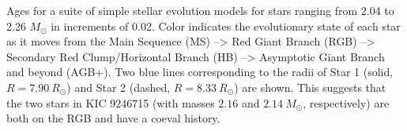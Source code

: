 \label{fig:mesa} Ages for a suite of simple stellar evolution models for stars ranging from 2.04 to 2.26 $M_{\odot}$ in increments of 0.02. Color indicates the evolutionary state of each star as it moves from the Main Sequence (MS) --> Red Giant Branch (RGB) --> Secondary Red Clump/Horizontal Branch (HB) --> Asymptotic Giant Branch and beyond (AGB+). Two blue lines corresponding to the radii of Star 1 (solid, $R = 7.90 \ R_\odot$) and Star 2 (dashed, $R = 8.33 \ R_\odot$) are shown. This suggests that the two stars in KIC 9246715 (with masses $2.16$ and $2.14 \ M_\odot$, respectively) are both on the RGB and have a coeval history.
  
  